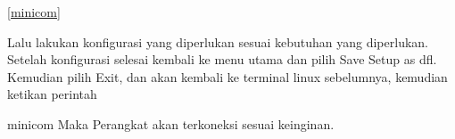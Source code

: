 	\ref{minicom}
	
	Lalu lakukan konfigurasi yang diperlukan sesuai kebutuhan yang diperlukan. Setelah konfigurasi selesai kembali ke menu utama dan pilih Save Setup as dfl. Kemudian pilih Exit, dan akan kembali ke terminal linux sebelumnya, kemudian ketikan perintah 
	
	minicom
	Maka Perangkat akan terkoneksi sesuai keinginan.

	


